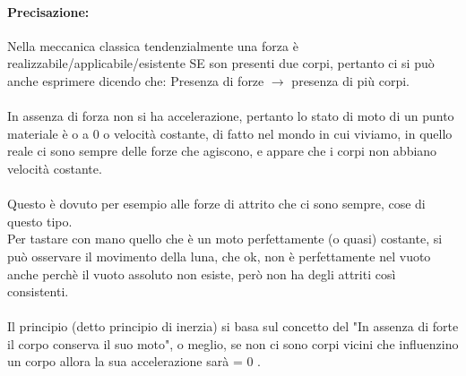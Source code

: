\documentclass[12pt, a4paper, openany, oneside]{book}
\begin{document}
\paragraph{Precisazione: } Nella meccanica classica tendenzialmente una forza è
realizzabile/applicabile/esistente SE son presenti due corpi, pertanto ci si può
anche esprimere dicendo che: Presenza di forze $\to$ presenza di più corpi. \\ \\
In assenza di forza non si ha accelerazione, pertanto lo stato di moto di un
punto materiale è o a 0 o velocità costante, di fatto nel mondo in cui viviamo,
in quello reale ci sono sempre delle forze che agiscono, e appare che i corpi
non abbiano velocità costante. \\ \\
Questo è dovuto per esempio alle forze di attrito che ci sono sempre, cose
di questo tipo. \\ 
Per tastare con mano quello che è un moto perfettamente (o quasi) costante, si 
può osservare il movimento della luna, che ok, non è perfettamente nel vuoto 
anche perchè il vuoto assoluto non esiste, però non ha degli attriti così consistenti.
\\ \\
Il principio (detto principio di inerzia) si basa sul concetto del "In assenza
di forte il corpo conserva il suo moto", o meglio, se non ci sono corpi vicini
che influenzino un corpo allora la sua accelerazione sarà = 0 .
\end{document}
